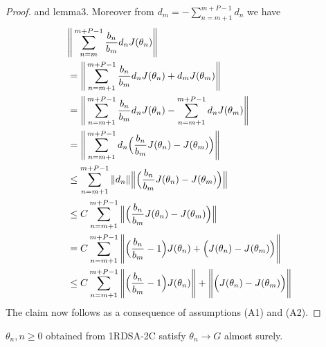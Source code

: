 \begin{proof}
 and lemma3. Moreover from $d_m=-\sum_{n=m+1}^{m+P-1}d_n$ we have
\begin{align*}
  & \Bigg{\|}\sum_{n=m}^{m+P-1}\frac{b_n}{b_m}d_n J(\theta_n)\Bigg{\|}\\
  & =\Bigg{\|}\sum_{n=m+1}^{m+P-1}\frac{b_n}{b_m}d_n J(\theta_n)+d_m J(\theta_{m})\Bigg{\|}\\
  & =\Bigg{\|}\sum_{n=m+1}^{m+P-1}\frac{b_n}{b_m}d_n J(\theta_n)-\sum_{n=m+1}^{m+P-1}d_n J(\theta_{m})\Bigg{\|}\\
  & =\Bigg{\|}\sum_{n=m+1}^{m+P-1}d_n\Big{(}\frac{b_n}{b_m}J(\theta_n)-J(\theta_{m})\Big{)}\Bigg{\|}\\
  & \leq \sum_{n=m+1}^{m+P-1}\|d_n\|\Big{\|}\Big{(}\frac{b_n}{b_m}J(\theta_n)-J(\theta_{m})\Big{)}\Big{\|}\\
  & \leq C \sum_{n=m+1}^{m+P-1}\Big{\|}\Big{(}\frac{b_n}{b_m}J(\theta_n)-J(\theta_{m})\Big{)}\Big{\|}\\
  & = C \sum_{n=m+1}^{m+P-1} \Bigg{\|}\Big{(}\frac{b_n}{b_m}-1\Big{)} J(\theta_n)
  +\Big{(} J(\theta_n)-J(\theta_{m})\Big{)}\Bigg{\|}\\
  &\leq C \sum_{n=m+1}^{m+P-1}\Bigg{\|}\Big{(}\frac{b_n}{b_m}-1\Big{)} J(\theta_n)\Bigg{\|}
  +\Bigg{\|}\Big{(} J(\theta_n)- J(\theta_{m})\Big{)}\Bigg{\|}
\end{align*}
The claim now follows as a consequence of assumptions (A1) and (A2).
\end{proof}
\begin{theorem}
 $\theta_n, n\geq0$ obtained from 1RDSA-2C satisfy $\theta_n \rightarrow G$
 almost surely.
\end{theorem}
